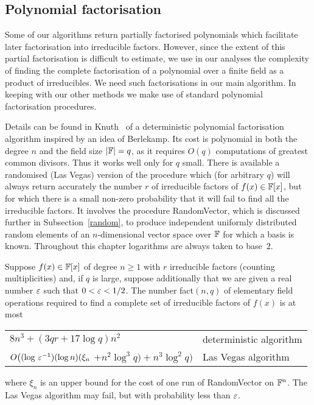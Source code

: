 \subsection*{Polynomial factorisation}\label{polyfactn}
%

Some of our algorithms return partially factorised polynomials
which facilitate later factorisation into
irreducible factors. However, since the extent of this partial factorisation
is difficult to estimate, we use in our
analyses the complexity of finding the complete 
factorisation of a polynomial over a finite field as a product of 
irreducibles. We need such factorisations in our main algorithm.
In keeping with our other methods we make use of standard
polynomial factorisation procedures.

Details can be found in Knuth~\cite[4.6.2]{AOCP2} of a deterministic 
polynomial factorisation algorithm inspired by an idea of Berlekamp. 
Its cost is polynomial in both the degree $n$ and the field size 
$|\mathbb{F}|=q$, as it requires $O(q)$ computations
of greatest common divisors. Thus it works well only for $q$ small. 
There is available a randomised (Las Vegas) version of the procedure
which (for arbitrary $q$) will always
return accurately the number $r$ of irreducible factors 
of $f(x)\in\mathbb{F}[x]$, but for which there is a small non-zero probability that it will 
fail to find all the irreducible factors.
It involves the procedure {\sc RandomVector}, which is discussed further in Subsection~\ref{random}, to 
produce independent uniformly distributed random elements of an 
$n$-dimensional vector space over $\mathbb{F}$  for 
which a basis is known. Throughout this chapter logarithms are always taken to 
base~$2$.

\begin{Rem}[\sc PolynomialFactorisation]\label{rem:polyfactn}
Suppose $f(x)\in \mathbb{F}[x]$ of degree $n\geq 1$ with $r$ irreducible 
factors (counting multiplicities) and, if $q$ is large, suppose
additionally that 
we are given a real number $\varepsilon$ such that $0<\varepsilon<1/2$. The  number 
fact$(n,q)$ of elementary field operations required to find a complete
set of irreducible factors of $f(x)$ is at most

\smallskip
\begin{tabular}{lp{1.8in}}
$8n^3 + (3qr+17\log q)n^2$& deterministic algorithm \\
$O\big((\log \,\varepsilon^{-1})(\log n)(\xi_n $ $+ n^2\log^3 q) +n^3\log^2q\big)$& 
Las Vegas algorithm
\end{tabular}\hspace*{-2mm}

\noindent where $\xi_n$ is an upper bound for the cost of one run of\/
{\sc RandomVector} on $\mathbb{F}^n$. The Las Vegas algorithm may fail, but with probability
less than $\varepsilon$.
\end{Rem}





